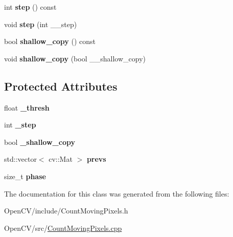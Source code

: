 \begin{DoxyCompactItemize}
int {\bfseries step} () const
\item 
\hypertarget{classskl_1_1_count_moving_pixels_a53cb9cc391d39c60a1de41c8ef27d283}{}\label{classskl_1_1_count_moving_pixels_a53cb9cc391d39c60a1de41c8ef27d283} 
void {\bfseries step} (int \+\_\+\+\_\+step)
\item 
\hypertarget{classskl_1_1_count_moving_pixels_a5f27cafa0f77b9476350ef2b14e9cdfd}{}\label{classskl_1_1_count_moving_pixels_a5f27cafa0f77b9476350ef2b14e9cdfd} 
bool {\bfseries shallow\+\_\+copy} () const
\item 
\hypertarget{classskl_1_1_count_moving_pixels_abcce3c874bc643cc301d62b1b8312b64}{}\label{classskl_1_1_count_moving_pixels_abcce3c874bc643cc301d62b1b8312b64} 
void {\bfseries shallow\+\_\+copy} (bool \+\_\+\+\_\+shallow\+\_\+copy)
\end{DoxyCompactItemize}
\subsection*{Protected Attributes}
\begin{DoxyCompactItemize}
\item 
\hypertarget{classskl_1_1_count_moving_pixels_aa663a7380267baef4f53dc10a218bc85}{}\label{classskl_1_1_count_moving_pixels_aa663a7380267baef4f53dc10a218bc85} 
float {\bfseries \+\_\+thresh}
\item 
\hypertarget{classskl_1_1_count_moving_pixels_a4ff07f9308bbbe59bf8b163b2c887702}{}\label{classskl_1_1_count_moving_pixels_a4ff07f9308bbbe59bf8b163b2c887702} 
int {\bfseries \+\_\+step}
\item 
\hypertarget{classskl_1_1_count_moving_pixels_a9f5d47fff1f077d7408f288fc8d77f8e}{}\label{classskl_1_1_count_moving_pixels_a9f5d47fff1f077d7408f288fc8d77f8e} 
bool {\bfseries \+\_\+shallow\+\_\+copy}
\item 
\hypertarget{classskl_1_1_count_moving_pixels_aaa51878cf7966d53ecdca9d15e4f92d9}{}\label{classskl_1_1_count_moving_pixels_aaa51878cf7966d53ecdca9d15e4f92d9} 
std\+::vector$<$ cv\+::\+Mat $>$ {\bfseries prevs}
\item 
\hypertarget{classskl_1_1_count_moving_pixels_a85b30818c6ebdb77ba0bb9cae60dae41}{}\label{classskl_1_1_count_moving_pixels_a85b30818c6ebdb77ba0bb9cae60dae41} 
size\+\_\+t {\bfseries phase}
\end{DoxyCompactItemize}


The documentation for this class was generated from the following files\+:\begin{DoxyCompactItemize}
\item 
Open\+C\+V/include/Count\+Moving\+Pixels.\+h\item 
Open\+C\+V/src/\hyperlink{_count_moving_pixels_8cpp}{Count\+Moving\+Pixels.\+cpp}\end{DoxyCompactItemize}
